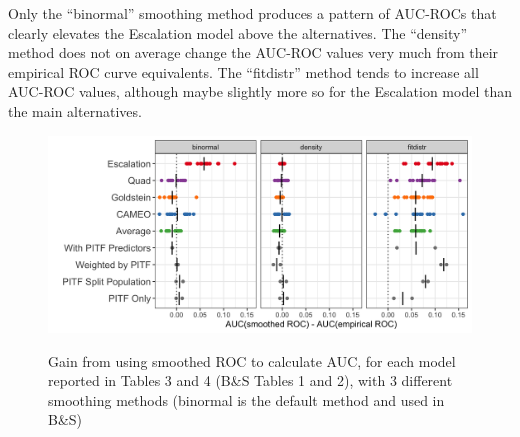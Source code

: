 \documentclass[
]{article}
\begin{document}
Only the ``binormal'' smoothing method produces a pattern of AUC-ROCs that clearly elevates the Escalation model above the alternatives. The ``density'' method does not on average change the AUC-ROC values very much from their empirical ROC curve equivalents. The ``fitdistr'' method tends to increase all AUC-ROC values, although maybe slightly more so for the Escalation model than the main alternatives.

\begin{figure}
{\centering \includegraphics[width=.95\linewidth]{figures/fig-a3-benefit-plot-extended.png}}
\caption{Gain from using smoothed ROC to calculate AUC, for each model reported in Tables 3 and 4 (B\&S Tables 1 and 2), with 3 different smoothing methods (binormal is the default method and used in B\&S)\label{fig:smooth-benefit-plot-extended}}
\end{figure}
\end{document}
